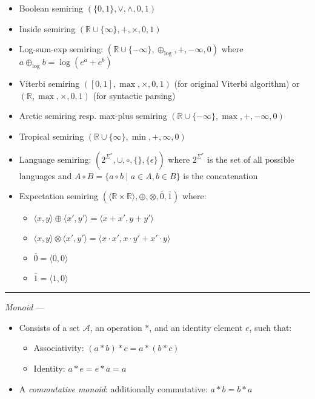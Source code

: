 \begin{itemize}
    \item Boolean semiring $(\{0, 1\}, \lor, \land, 0, 1)$
    \item Inside semiring $(\mathbb{R} \cup \{\infty\}, +, \times, 0, 1)$
    \item Log-sum-exp semiring: $(\mathbb{R} \cup \{-\infty\}, \oplus_{\textrm{log}}, +, -\infty, 0)$ where $a \oplus_{\textrm{log}} b = \log(e^a + e^b)$
    \item Viterbi semiring $([0,1], \max, \times, 0,1)$ (for original Viterbi algorithm) or $(\mathbb{R}, \max, \times, 0,1)$ (for syntactic parsing)
    \item Arctic semiring resp. max-plus semiring $(\mathbb{R} \cup \{-\infty\}, \max, +, -\infty, 0)$
    \item Tropical semiring $(\mathbb{R} \cup \{\infty\}, \min, +, \infty, 0)$
    \item Language semiring: $(2^{\Sigma^*}, \cup, \circ, \{\}, \{\epsilon\})$ where $2^{\Sigma^*}$ is the set of all possible languages and $A \circ B = \{a \circ b \mid a \in A, b \in B\}$ is the concatenation
    \item Expectation semiring $
    ( \langle \mathbb{R} \times \mathbb{R} \rangle, \oplus, \otimes, \overline{0}, \overline{1} )
    $ where:
    \begin{itemize}
        \item
        $
        \langle x, y \rangle \oplus \langle x', y' \rangle = \langle x + x', y + y' \rangle
        $
        \item $
        \langle x, y \rangle \otimes \langle x', y' \rangle = \langle x \cdot x', x \cdot y' + x' \cdot y \rangle$
        \item $\overline{0} = \langle 0,0 \rangle$
        \item $\overline{1} = \langle 1,0 \rangle$
    \end{itemize}
\end{itemize}

{\color{lightgray}\hrule height 0.001mm}

\emph{Monoid} ---
\begin{itemize}
    \item Consists of a set $\mathcal{A}$, an operation $*$, and an identity element $e$, such that:
    \begin{itemize}
        \item Associativity: $(a * b) * c = a * (b * c)$
        \item Identity: $a * e = e * a = a$
    \end{itemize}
    \item A \emph{commutative monoid}: additionally commutative: $a * b = b * a$
\end{itemize}
